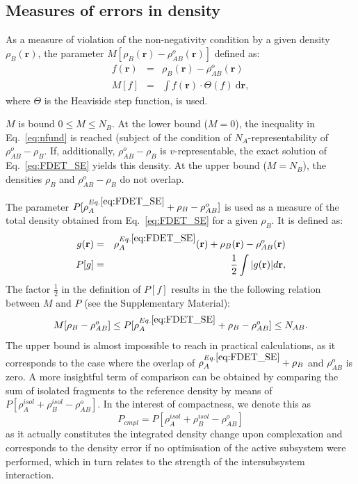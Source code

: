 \documentclass[amsmath,amssymb,preprint,aip,jcp]{revtex4-1}
\begin{document}
\subsection{Measures of errors in density}
As a measure of violation of the non-negativity condition by a given density $\rho_{B}(\mathbf{r})$, the
 parameter $M[\rho_{B}(\mathbf{r})-\rho^{o}_{AB}(\mathbf{r})]$ defined as:
\begin{eqnarray}\label{eq:M}
f(\mathbf{r})&=&\rho_{B}(\mathbf{r})-\rho^{o}_{AB}(\mathbf{r}) \nonumber\\
 M[f] & = & \int f(\mathbf{r})\cdot \Theta(f) \ \mathrm{d}\mathbf{r}, \label{eq:def_M}
\end{eqnarray}
where $\Theta$ is the Heaviside step function, is used.

$M$ is bound $0 \le M\le N_{B}$. At the lower bound ($M=0$), the inequality in Eq.~\ref{eq:nfund} is reached (subject of the condition of $N_A$-representability of $\rho^{o}_{AB}-\rho_{B}$. If, additionally, $\rho^{o}_{AB}-\rho_{B}$ is $v$-representable, the exact solution of Eq.~\ref{eq:FDET_SE} yields this density. At the upper bound ($M=N_{B}$), the densities $\rho_{B}$ and $\rho^{o}_{AB}-\rho_{B}$ do not overlap.

The parameter $P[\rho_A^{Eq.\ref{eq:FDET_SE}}+\rho_B-\rho_{AB}^{o}]$ is used as a measure of the total density obtained from Eq.~\ref{eq:FDET_SE}
for a given $\rho_{B}$. It is defined as: 
\begin{eqnarray}
g(\mathbf{r})&=&\rho^{Eq.\ref{eq:FDET_SE}}_A(\mathbf{r})+ \rho_B(\mathbf{r}) - \rho_{AB}^{o}(\mathbf{r}) \nonumber\\
 P[g] &=& \frac{1}{2} 
 \int \vert g(\mathbf{r}) \vert d\mathbf{r}, \label{eq:def_P}
\end{eqnarray}
The factor $\frac{1}{2}$ in the definition of $P[f]$ results in
the the following relation between $M$ and $P$ (see the Supplementary Material):
\begin{equation} \label{eq:P_bound}
 M[\rho_{B} - \rho^{o}_{AB}] \leq P[\rho^{Eq.\ref{eq:FDET_SE}}_A+\rho_B - \rho_{AB}^{o}] \leq %
 N_{AB}.
\end{equation}
The upper bound is almost impossible to reach in practical calculations, as it corresponds to the case where the overlap of $\rho^{Eq.\ref{eq:FDET_SE}}_A+\rho_B$ and $\rho_{AB}^{o}$ is zero. A more insightful term of comparison can be obtained by comparing the sum of isolated fragments to the reference density by means of $P[\rho_A^{isol}+\rho_B^{isol} - \rho_{AB}^{o}]$. In the interest of compactness, we denote this as
\begin{equation}\label{eq:p_cmpl}
 P_{cmpl} = P[\rho_A^{isol}+\rho_B^{isol} - \rho_{AB}^{o}]
\end{equation}
as it actually constitutes the integrated density change upon complexation and corresponds to the density error if no optimisation of the active subsystem were performed, which in turn relates to the strength of the intersubsystem interaction.
\end{document}
